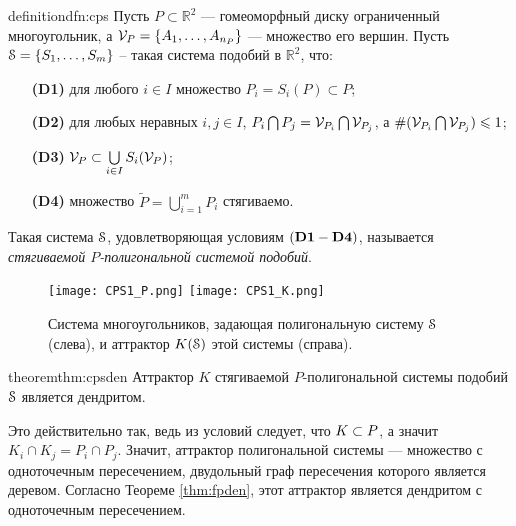 
\begin{restatethis}{definition}{dfn:cps} \label{dfn:cps}
Пусть $P\subset\mathbb{R}^2$ ---  гомеоморфный диску ограниченный многоугольник, а $ {\mathcal V}_P= \{A_1, \ldots, A_{n_P}\}$ --- множество его вершин.
Пусть  ${\EuScript S} = \{S_1, \ldots, S_m\}$ -- такая система подобий в ${\mathbb{R}}^2$, что:
\begin{itemize}[nolistsep]
\item[{\bf (D1)}] для любого $i \in I$ множество $P_i = S_i (P) \subset P$; 
\item[{\bf (D2)}] для любых неравных $i, j \in I$,  $P_i \bigcap P_j =  {\mathcal V}_{P_i} \bigcap  {\mathcal V}_{P_j}$, а $\#({\mathcal V}_{P_i} \bigcap  {\mathcal V}_{P_j})\leqslant 1$;  
\item[{\bf (D3)}] ${\mathcal V}_P \subset \bigcup \limits_{i \in I} S_i ({\mathcal V}_P)$;
\item[{\bf (D4)}] множество $\widetilde P = \bigcup \limits_{i = 1} ^m P_i$ стягиваемо.
\end{itemize} 
Такая система  ${\EuScript S}$, удовлетворяющая условиям $\bf (D1 - D4)$, называется  {\em стягиваемой $P$-полигональной системой подобий}.
\end{restatethis}

\begin{figure}[H]
\texttt{[image: CPS1\_P.png]}
\hfill
\texttt{[image: CPS1\_K.png]}
\caption{Система многоугольников, задающая полигональную систему ${\EuScript S}$ (слева), и аттрактор $K({\EuScript S})$ этой системы (справа).}
\end{figure}

\begin{restatethis}{theorem}{thm:cpsden} %
Аттрактор $K$  стягиваемой  $P$-полигональной системы подобий ${\EuScript S}$ является дендритом.
\end{restatethis}

Это действительно так, ведь из условий следует, что $K\subset P$, а значит $K_i\cap K_j=P_i\cap P_j$.
Значит, аттрактор полигональной системы --- множество с одноточечным пересечением, двудольный граф пересечения которого является деревом.
Согласно Теореме \ref{thm:fpden}, этот аттрактор является дендритом с одноточечным пересечением.\\

